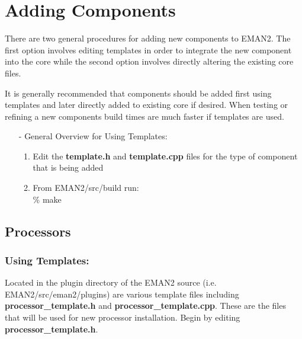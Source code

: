 \section{Adding Components}
  \label{ADDING-COMPONENTS}

There are two general procedures for adding new components to EMAN2.
The first option involves editing templates in order to integrate the
new component into the core while the second option involves directly
altering the existing core files.  

It is generally recommended that components should be added first
using templates and later directly added to existing core if 
desired.  When testing or refining a new components build times are much
faster if templates are used.  
\begin{itemize}
  \item[-]
    General Overview for Using Templates:
    \begin{enumerate}
    \item
      Edit the \textbf{template.h} and
      \textbf{template.cpp} files for the type of 
      component that is being added
    \item
      From EMAN2/src/build run:\\
      { \% make}
    \end{enumerate}
\end{itemize}

\subsection{Processors}
  \label{ADDING-PROCESSORS} 

      \subsubsection{Using Templates:}
      Located in the plugin directory of the EMAN2 source
      (i.e. EMAN2/src/eman2/plugins) are various template files including
      \textbf{processor\_template.h} and \textbf{processor\_template.cpp}.  These are the files
      that will be used for new processor installation.  Begin by editing
      \textbf{processor\_template.h}. 

